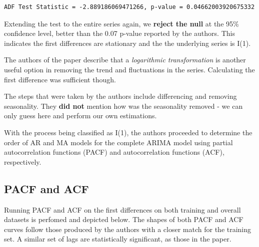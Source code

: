 \documentclass[
  letterpaper,
  DIV=11,
  numbers=noendperiod]{scrartcl}
\begin{document}
\begin{verbatim}
ADF Test Statistic = -2.889186069471266, p-value = 0.04662003920675332
\end{verbatim}

Extending the test to the entire series again, we \textbf{reject the
null} at the 95\% confidence level, better than the 0.07 p-value
reported by the authors. This indicates the first differences are
stationary and the the underlying series is I(1).

The authors of the paper describe that a \emph{logarithmic
transformation} is another useful option in removing the trend and
fluctuations in the series. Calculating the first difference was
sufficient though.

The steps that were taken by the authors include differencing and
removing seasonality. They \textbf{did not} mention how was the
seasonality removed - we can only guess here and perform our own
estimations.

With the process being classified as I(1), the authors proceeded to
determine the order of AR and MA models for the complete ARIMA model
using partial autocorrelation functions (PACF) and autocorrelation
functions (ACF), respectively.

\hypertarget{pacf-and-acf}{%
\subsection{PACF and ACF}\label{pacf-and-acf}}

Running PACF and ACF on the first differences on both training and
overall datasets is perfomed and depicted below. The shapes of both PACF
and ACF curves follow those produced by the authors with a closer match
for the training set. A similar set of lags are statistically
significant, as those in the paper.
\end{document}
